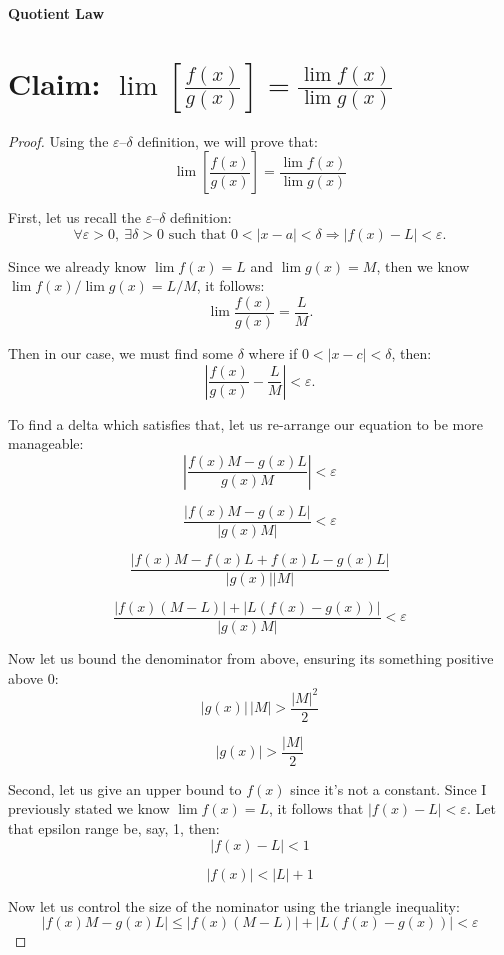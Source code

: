 \documentclass{article}
\begin{document}
	
\textbf{Quotient Law}
	
\section*{Claim: $\lim \left[ \frac{f(x)}{g(x)} \right] = \frac{\lim f(x)}{\lim g(x)}$}
	
	
\begin{proof}


Using the $\varepsilon$–$\delta$ definition, we will prove that:
\[
\lim \left[ \frac{f(x)}{g(x)} \right] = \frac{\lim f(x)}{\lim g(x)}
\]

	

First, let us recall the $\varepsilon$–$\delta$ definition:
\[
\forall \varepsilon > 0, \ \exists \delta > 0 \text{ such that } 0 < |x - a| < \delta \Rightarrow \left|f(x) - L\right| < \varepsilon.
\]   


Since we already know $\lim f(x) = L$ and $\lim g(x) = M$, then we know $\lim f(x) / \lim g(x) = L/M$, it follows:
\[
\lim \frac{f(x)}{g(x)} = \frac{L}{M}.
\]


Then in our case, we must find some $\delta$ where if $0 < |x - c| < \delta$, then:
\[
\left| \frac{f(x)}{g(x)} - \frac{L}{M} \right| < \varepsilon.
\]


To find a delta which satisfies that, let us re-arrange our equation to be more manageable:
\[
\left| \frac{f(x)M - g(x)L}{g(x)M} \right| < \varepsilon
\]

\[
\frac{\left| f(x)M - g(x)L \right|}{\left| g(x)M \right|} < \varepsilon
\]

\[
\frac{|f(x)M - f(x)L + f(x)L - g(x)L|}{|g(x)||M|}
\]


\[
\frac{ \left| f(x)(M - L) \right| + \left| L(f(x) - g(x)) \right| }{ \left| g(x)M \right| } < \varepsilon
\]



Now let us bound the denominator from above, ensuring its something positive above $0$:
\[
|g(x)| \, |M| > \frac{|M|^2}{2}
\]

\[
|g(x)| > \frac{|M|}{2}
\]


Second, let us give an upper bound to $f(x)$ since it’s not a constant. Since I previously stated we know $\lim f(x) = L$, it follows that $|f(x) - L| < \varepsilon$. Let that epsilon range be, say, 1, then:
\[
|f(x) - L| < 1
\]

\[
|f(x)| < |L| + 1
\]


Now let us control the size of the nominator using the triangle inequality:
\[
|f(x)M - g(x)L| \leq |f(x)(M - L)| + |L(f(x) - g(x))| < \varepsilon
\]


\end{proof}
\end{document}
